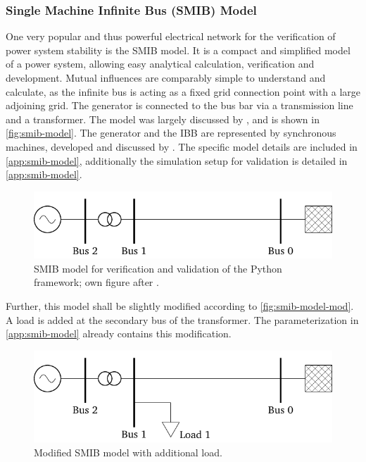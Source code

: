 \subsubsection{Single Machine Infinite Bus (SMIB) Model}

One very popular and thus powerful electrical network for the verification of power system stability is the \acs{SMIB} model. 
It is a compact and simplified model of a power system, allowing easy analytical calculation, verification and development. 
Mutual influences are comparably simple to understand and calculate, as the infinite bus is acting as a fixed grid connection point with a large adjoining grid. 
The generator is connected to the bus bar via a transmission line and a transformer. 
The model was largely discussed by \textcite{kundur_2022}, and is shown in \autoref{fig:smib-model}. 
The generator and the \acf{IBB} are represented by synchronous machines, developed and discussed by \textcite{kordowich_2023}. 
The specific model details are included in \autoref{app:smib-model}, additionally the simulation setup for validation is detailed in \autoref{app:smib-model}.

\begin{figure}[htbp!]
    \centering
    \vspace{12pt}
    \includegraphics{tikz_graphics/images/smib_model.pdf}
    \vspace{12pt}
    \caption[Single line respresentation of the \acs{SMIB} model]{\acf{SMIB} model for verification and validation of the Python framework; own figure after \autocite{machowski_2020,kundur_2022}.}
    \label{fig:smib-model}
\end{figure}

Further, this model shall be slightly modified according to \autoref{fig:smib-model-mod}. 
A load is added at the secondary bus of the transformer. %
The parameterization in \autoref{app:smib-model} already contains this modification.

\begin{figure}[htbp!]
    \centering
    \vspace{12pt}
    \includegraphics{tikz_graphics/images/smib_model_with_load.pdf}
    \vspace{12pt}
    \caption[Modified \acf{SMIB} model with additional load]{Modified \acf{SMIB} model with additional load.}
    \label{fig:smib-model-mod}
\end{figure}

